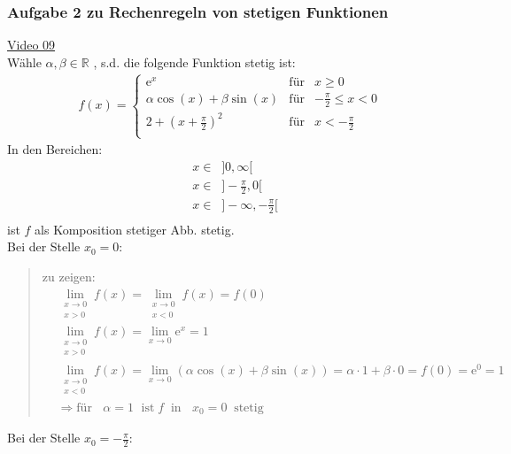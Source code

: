 \subsubsection{Aufgabe 2 zu Rechenregeln von stetigen Funktionen}
\href{https://youtu.be/hae5ZE-L7QU}{Video 09}\\
Wähle $ \alpha ,\beta \in\mathbb{R} $ , s.d. die folgende Funktion stetig ist:\\
\begin{align*}
f(x) =     \left\{ \begin{array}{rcr}
\mathrm{e}^x & \mbox{für} & x\geq 0\\
\alpha \cos(x)+\beta \sin(x) & \mbox{für} & -\frac{\pi}{2}\leq x < 0 \\
2+(x+\frac{\pi}{2})^2 & \mbox{für} & x< -\frac{\pi}{2}\\
\end{array}\right.
\end{align*}
In den Bereichen:\\
\begin{align*}
&x\in \;\; ]0,\infty[\\
&x\in \;\;]-\frac{\pi}{2},0[ \\
&x\in \;\;]-\infty,-\frac{\pi}{2}[\\
\end{align*}
ist $ f $ als Komposition stetiger Abb. stetig.\\
\newpage
\noindent
\textbullet\;\; Bei der Stelle $ x_0=0 $:\\
\begin{quote}
	zu zeigen:\\
	\begin{align*}
	&\lim\limits_ {\substack{x \to 0 \\ x>0}}f(x)=\lim\limits_ {\substack{x \to 0 \\ x<0}}f(x)=f(0)\\
	&\lim\limits_ {\substack{x \to 0 \\ x>0}}f(x)=\lim\limits_ {x\to 0}\mathrm{e}^x=1\\
	&\lim\limits_ {\substack{x \to 0 \\ x<0}}f(x)=\lim\limits_ {x\to 0}(\alpha \cos(x)+\beta \sin(x))=\alpha\cdot 1+\beta \cdot0=f(0)=\mathrm{e}^0=1\\
	&\Rightarrow \text{für }\;\;\alpha=1\;\text{ ist}\;f \;\;\text{in }\;\;x_0=0\;\;\text{stetig }
	\end{align*}
	
\end{quote}
\textbullet\;\; Bei der Stelle $ x_0=-\frac{\pi}{2} $:\\
